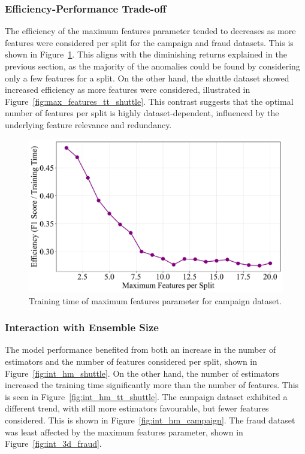 \documentclass[10pt, conference]{IEEEtran}
\begin{document}
\subsubsection{Efficiency-Performance Trade-off}

The efficiency of the maximum features parameter tended to decreases as more features were considered per split for the campaign and fraud datasets. This is shown in Figure~\ref{fig:max_features_tt_campaign}. This aligns with the diminishing returns explained in the previous section, as the majority of the anomalies could be found by considering only a few features for a split. On the other hand, the shuttle dataset showed increased efficiency as more features were considered, illustrated in Figure~\ref{fig:max_features_tt_shuttle}. This contrast suggests that the optimal number of features per split is highly dataset-dependent, influenced by the underlying feature relevance and redundancy.




\begin{figure}[H]
	\centering
	\includegraphics[width=0.95\linewidth]{../results/campaign/max_features/efficiency_vs_max_features.pdf}
	\caption{Training time of maximum features parameter for campaign dataset.}
	\label{fig:max_features_tt_campaign}
\end{figure}

\subsubsection{Interaction with Ensemble Size}
The model performance benefited from both an increase in the number of estimators and the number of features considered per split, shown in Figure~\ref{fig:int_hm_shuttle}.  On the other hand, the number of estimators increased the training time significantly more than the number of features. This is seen in Figure~\ref{fig:int_hm_tt_shuttle}. The campaign dataset exhibited a different trend, with still more estimators favourable, but fewer features considered. This is shown in Figure~\ref{fig:int_hm_campaign}. The fraud dataset was least affected by the maximum features parameter, shown in Figure~\ref{fig:int_3d_fraud}.
\end{document}
